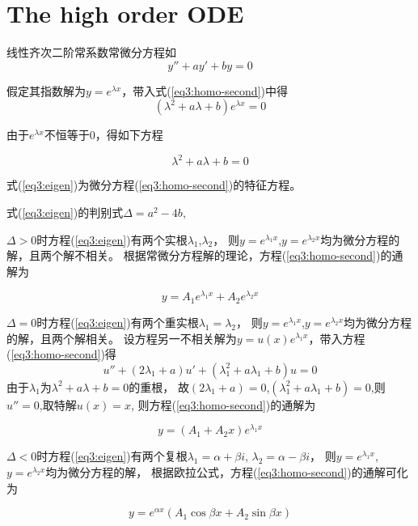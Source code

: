 \chapter{The high order ODE}

线性齐次二阶常系数常微分方程如
\begin{equation}\label{eq3:homo-second}
    y''+ay'+by=0
\end{equation}

假定其指数解为$y=e^{\lambda x}$，带入式(\ref{eq3:homo-second})中得
\begin{equation*}
    (\lambda^{2}+a\lambda+b)e^{\lambda x}=0
\end{equation*}

由于$e^{\lambda x}$不恒等于0，得如下方程

\begin{equation}\label{eq3:eigen}
    \lambda^{2}+a\lambda+b=0
\end{equation}

式(\ref{eq3:eigen})为微分方程(\ref{eq3:homo-second})的特征方程。

式(\ref{eq3:eigen})的判别式$\Delta=a^{2}-4b$,

$\Delta>0$时方程(\ref{eq3:eigen})有两个实根$\lambda_{1}$,$\lambda_{2}$，
则$y=e^{\lambda_{1}x}$,$y=e^{\lambda_{2}x}$均为微分方程的解，且两个解不相关。
根据常微分方程解的理论，方程(\ref{eq3:homo-second})的通解为

\begin{equation}
    y=A_{1}e^{\lambda_{1}x}+A_{2}e^{\lambda_{2}x}
\end{equation}

$\Delta=0$时方程(\ref{eq3:eigen})有两个重实根$\lambda_{1}=\lambda_{2}$，
则$y=e^{\lambda_{1}x}$,$y=e^{\lambda_{2}x}$均为微分方程的解，且两个解相关。
设方程另一不相关解为$y=u(x)e^{\lambda_{1}x}$，带入方程(\ref{eq3:homo-second})得
$$u''+(2\lambda_{1}+a)u'+(\lambda_{1}^{2}+a\lambda_{1}+b)u=0$$
由于$\lambda_{1}$为$\lambda^{2}+a\lambda +b=0$的重根，
故$(2\lambda_{1}+a)=0$,$(\lambda_{1}^{2}+a\lambda_{1}+b)=0$,则$u''=0$,取特解$u(x)=x$,
则方程(\ref{eq3:homo-second})的通解为

\begin{equation}
    y=(A_{1}+A_{2}x)e^{\lambda_{1}x}
\end{equation}

$\Delta<0$时方程(\ref{eq3:eigen})有两个复根$\lambda_{1}=\alpha+\beta i$,
$\lambda_{2}=\alpha-\beta i$，
则$y=e^{\lambda_{1}x}$,$y=e^{\lambda_{2}x}$均为微分方程的解，
根据欧拉公式，方程(\ref{eq3:homo-second})的通解可化为

\begin{equation}
    y=e^{\alpha x}(A_{1}\cos \beta x+A_{2}\sin \beta x)
\end{equation}
